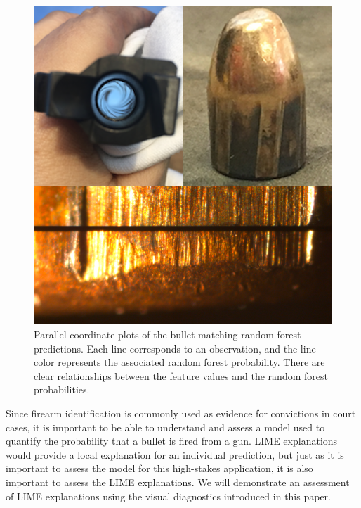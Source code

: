 \documentclass[AMS,STIX2COL]{WileyNJD-v2}\usepackage[]{graphicx}\usepackage[]{color}
\newenvironment{knitrout}{}{} %
\begin{document}
\begin{figure}[!thp]
\begin{knitrout}
\color{fgcolor}

{\centering \includegraphics[width=6.5in]{figure-static/figure-08-1} 

}



\end{knitrout}
\caption{Parallel coordinate plots of the bullet matching random forest predictions. Each line corresponds to an observation, and the line color represents the associated random forest probability. There are clear relationships between the feature values and the random forest probabilities.}
\label{fig:figure-08}
\end{figure}

Since firearm identification is commonly used as evidence for convictions in court cases, it is important to be able to understand and assess a model used to quantify the probability that a bullet is fired from a gun. LIME explanations would provide a local explanation for an individual prediction, but just as it is important to assess the model for this high-stakes application, it is also important to assess the LIME explanations. We will demonstrate an assessment of LIME explanations using the visual diagnostics introduced in this paper.
\end{document}
